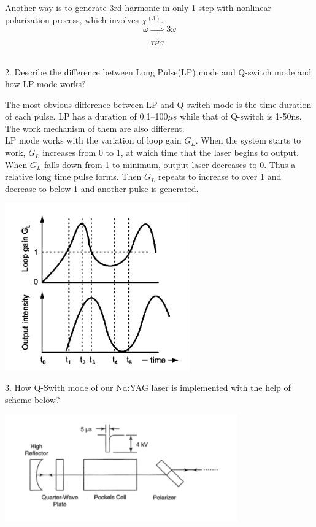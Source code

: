 \documentclass{article}
\begin{document}
Another way is to generate 3rd harmonic in only 1 step with nonlinear polarization process, which involves $\chi^{(3)}$.
\begin{equation*}
\omega \underbrace{\Longrightarrow}_{THG} 3\omega 
\end{equation*} \\
\par 
2. Describe the difference between Long Pulse(LP) mode and Q-switch mode and how LP mode works?\par 
The most obvious difference between LP and Q-switch mode is the time duration of each pulse. LP has a duration of 0.1--100$\mu s$ while that of Q-switch is 1-50ns. The work mechanism of them are also different.   \\
LP mode works with the variation of loop gain $G_L$. When the system starts to work, $G_L$ increases from 0 to 1, at which time that the laser begins to output. When  $G_L$ falls down from 1 to minimum, output laser decreases to 0. Thus a relative long time pulse forms.  Then  $G_L$ repeats to increase to over 1 and decrease to below 1 and another pulse is generated.
\begin{center}
\includegraphics[width=8cm]{pic1}
\end{center}
\par  
3. How Q-Swith mode of our Nd:YAG laser is implemented with the help of scheme below?
\begin{center}
\includegraphics[width=10cm]{pic2}
\end{center}
\end{document}
